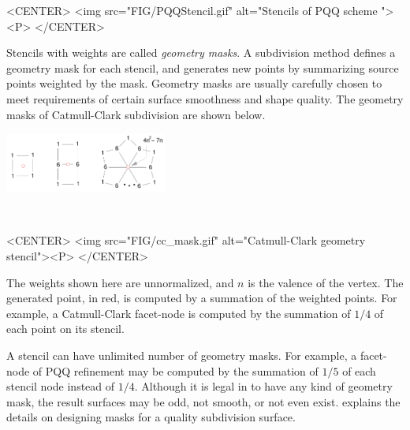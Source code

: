 \begin{ccHtmlOnly}
  <CENTER>
     <img src="FIG/PQQStencil.gif" alt="Stencils of PQQ scheme "><P>
  </CENTER>
\end{ccHtmlOnly}


Stencils with weights are called \emph{geometry masks}.
A subdivision method defines a geometry mask for each stencil, and 
generates new points by summarizing source points weighted by the mask.
Geometry masks are usually carefully chosen to meet requirements of 
certain surface smoothness and shape quality.
The geometry masks of Catmull-Clark subdivision are shown
below.  

\begin{ccTexOnly}
  \begin{center}
    \parbox{0.4\textwidth}{%
      \includegraphics[width=0.4\textwidth]{Subdivision_method_3/FIG/cc_mask}%
    } \\ \vspace{0.5cm}
  \end{center}
\end{ccTexOnly}

\begin{ccHtmlOnly}
  <CENTER>
     <img src="FIG/cc_mask.gif" alt="Catmull-Clark geometry stencil"><P>
  </CENTER>
\end{ccHtmlOnly}

The weights shown here are unnormalized, and $n$ is the valence 
of the vertex. The generated point, in red, is computed by a summation
of the weighted points. For example, a Catmull-Clark facet-node is 
computed by the summation of $1/4$ of each point on its stencil.

A stencil can have unlimited number of geometry masks. For example, 
a facet-node of PQQ refinement may be computed by 
the summation of $1/5$ of each stencil node instead of $1/4$.
Although it is legal in  to have 
any kind of geometry mask, the result surfaces may be odd, 
not smooth, or not even exist. \cite{cgal:ww-smgd-02} explains the 
details on designing masks for a quality subdivision surface.

